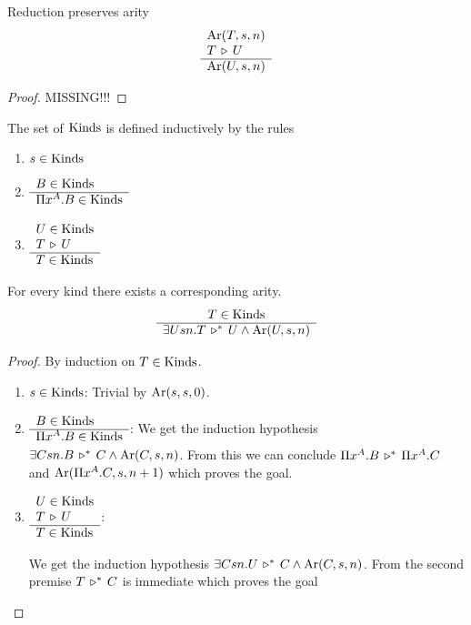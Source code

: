 \begin{lemma}
  \label{reductionpreservesarity}
  Reduction preserves arity
  $$
  \begin{array}{l} \text{Ar}(T,s,n) \\ T \,\triangleright\, U \\ \hline \text{Ar}(U,s,n)\end{array}
  $$
  \begin{proof}
    MISSING!!!
  \end{proof}
\end{lemma}


\begin{definition} %
  The set of $\text{Kinds}$ is defined inductively by the rules

  \begin{enumerate}

  \item $s \in \text{Kinds}$

  \item $\begin{array}{l} B \in \text{Kinds} \\ \hline \Pi x^A.B \in \text{Kinds}\end{array}$

  \item $\begin{array}{l} U \in \text{Kinds} \\ T \,\triangleright\, U  \\ \hline T \in \text{Kinds}\end{array}$

  \end{enumerate}
\end{definition}


\begin{lemma}
  \label{kindisarity}
  For every kind there exists a corresponding arity.
  $$
  \begin{array}{c} T \in \text{Kinds} \\ \hline \exists U s n. T \,\triangleright^*\, U \land \text{Ar}(U,s,n)\end{array}
  $$
  \begin{proof}
    By induction on $T \in \text{Kinds}$.
    \begin{enumerate}

    \item $s \in \text{Kinds}$: Trivial by $\text{Ar}(s,s,0)$.


    \item $\begin{array}{l} B \in \text{Kinds} \\ \hline \Pi x^A.B \in \text{Kinds}\end{array}$:
      We get the induction hypothesis
      $ \exists C s n. B \,\triangleright^*\, C \land \text{Ar}(C,s,n)
      $.
      From this we can conclude $\Pi x^A.B \,\triangleright^*\, \Pi x^A.C$ and $\text{Ar}(\Pi
      x^A.C, s, n+1)$ which proves the goal.


    \item $\begin{array}{l} U \in \text{Kinds} \\ T \,\triangleright\, U  \\ \hline T \in \text{Kinds}\end{array}$:

      We get the induction hypothesis
      $\exists Csn. U \,\triangleright^*\, C \land \text{Ar}(C,s,n)$. From the second premise
      $T \,\triangleright^*\, C$ is immediate which proves the goal
    \end{enumerate}
  \end{proof}
\end{lemma}



